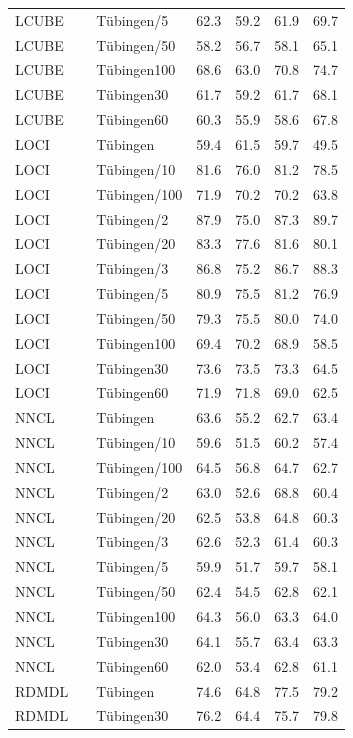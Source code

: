 \begin{tabular}{lllllll}
LCUBE &  & Tübingen/5 & 62.3 & 59.2 & 61.9 & 69.7 \\
LCUBE &  & Tübingen/50 & 58.2 & 56.7 & 58.1 & 65.1 \\
LCUBE &  & Tübingen100 & 68.6 & 63.0 & 70.8 & 74.7 \\
LCUBE &  & Tübingen30 & 61.7 & 59.2 & 61.7 & 68.1 \\
LCUBE &  & Tübingen60 & 60.3 & 55.9 & 58.6 & 67.8 \\
LOCI &  & Tübingen & 59.4 & 61.5 & 59.7 & 49.5 \\
LOCI &  & Tübingen/10 & 81.6 & 76.0 & 81.2 & 78.5 \\
LOCI &  & Tübingen/100 & 71.9 & 70.2 & 70.2 & 63.8 \\
LOCI &  & Tübingen/2 & 87.9 & 75.0 & 87.3 & 89.7 \\
LOCI &  & Tübingen/20 & 83.3 & 77.6 & 81.6 & 80.1 \\
LOCI &  & Tübingen/3 & 86.8 & 75.2 & 86.7 & 88.3 \\
LOCI &  & Tübingen/5 & 80.9 & 75.5 & 81.2 & 76.9 \\
LOCI &  & Tübingen/50 & 79.3 & 75.5 & 80.0 & 74.0 \\
LOCI &  & Tübingen100 & 69.4 & 70.2 & 68.9 & 58.5 \\
LOCI &  & Tübingen30 & 73.6 & 73.5 & 73.3 & 64.5 \\
LOCI &  & Tübingen60 & 71.9 & 71.8 & 69.0 & 62.5 \\
NNCL &  & Tübingen & 63.6 & 55.2 & 62.7 & 63.4 \\
NNCL &  & Tübingen/10 & 59.6 & 51.5 & 60.2 & 57.4 \\
NNCL &  & Tübingen/100 & 64.5 & 56.8 & 64.7 & 62.7 \\
NNCL &  & Tübingen/2 & 63.0 & 52.6 & 68.8 & 60.4 \\
NNCL &  & Tübingen/20 & 62.5 & 53.8 & 64.8 & 60.3 \\
NNCL &  & Tübingen/3 & 62.6 & 52.3 & 61.4 & 60.3 \\
NNCL &  & Tübingen/5 & 59.9 & 51.7 & 59.7 & 58.1 \\
NNCL &  & Tübingen/50 & 62.4 & 54.5 & 62.8 & 62.1 \\
NNCL &  & Tübingen100 & 64.3 & 56.0 & 63.3 & 64.0 \\
NNCL &  & Tübingen30 & 64.1 & 55.7 & 63.4 & 63.3 \\
NNCL &  & Tübingen60 & 62.0 & 53.4 & 62.8 & 61.1 \\
RDMDL &  & Tübingen & 74.6 & 64.8 & 77.5 & 79.2 \\
RDMDL &  & Tübingen30 & 76.2 & 64.4 & 75.7 & 79.8 \\

\end{tabular}
